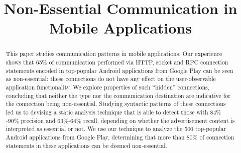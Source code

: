 \documentclass{sig-alternate}
\begin{document}

\title{Non-Essential Communication in Mobile Applications}



\maketitle
\begin{abstract}
This paper studies communication patterns in mobile applications.
Our experience shows that 65\% of communication performed via HTTP, socket and RPC connection statements encoded in
top-popular Android applications from Google Play can be seen as non-essential: these connections do not have any effect on the user-observable application functionality. 
We explore properties of such ``hidden'' connections, concluding that neither the type nor the communication destination are indicative for the connection being non-essential. 
Studying syntactic patterns of these connections led us to devising a static analysis technique that 
is able to detect those with 84\% -90\% precision and 63\%-64\% recall, depending on whether the advertisement content is interpreted as  essential or not. 
We use our technique to analyze the 500 top-popular Android applications from Google Play, determining that more than 80\% of 
connection statements in these applications can be deemed non-essential.
%
\end{abstract}
\end{document}
